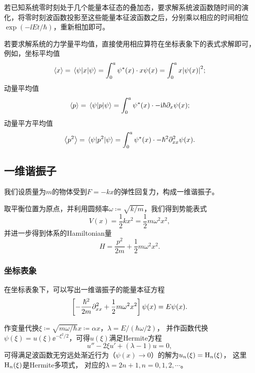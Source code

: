 若已知系统零时刻处于几个能量本征态的叠加态，要求解系统波函数随时间的演化，将零时刻波函数投影至这些能量本征波函数之后，分别乘以相应的时间相位$\exp(-\ii E t/\hbar)$，重新相加即可。

若要求解系统的力学量平均值，直接使用相应算符在坐标表象下的表式求解即可，例如，坐标平均值
\begin{equation}
    \expval{x} = \mel{\psi}{x}{\psi} = \int_0^a \psi^*(x) \cdot x \psi(x) = \int_0^a x \abs{\psi(x)}^2;
\end{equation}
动量平均值
\begin{equation}
    \expval{p} = \mel{\psi}{p}{\psi} = \int_0^a \psi^*(x) \cdot -\ii\hbar\pd_x \psi(x);
\end{equation}
动量平方平均值
\begin{equation}
    \expval{p^2} = \mel{\psi}{p^2}{\psi} = \int_0^a \psi^*(x) \cdot -\hbar^2\pd_{xx}^2 \psi(x).
\end{equation}


\subsection{一维谐振子}
\label{subsec:onedim_osc}

我们设质量为$m$的物体受到$F=-kx$的弹性回复力，构成一维谐振子。

取平衡位置为原点，并利用圆频率$\omega\coloneq\sqrt{k/m}$，我们得到势能表式
\begin{equation}
    V(x) = \frac12 kx^2 = \frac12 m\omega^2 x^2,
\end{equation}
并进一步得到体系的Hamiltonian量
\begin{equation}
    \label{eq:onedim_osc_ham}
    H = \frac{p^2}{2m} + \frac12 m\omega^2 x^2.
\end{equation}

\subsubsection{坐标表象}

在坐标表象下，可以写出一维谐振子的能量本征方程
\begin{equation}
    \left[ -\frac{\hbar^2}{2m}\pd_{xx}^2 + \frac12 m\omega^2 x^2 \right] \psi(x) = E\psi(x).
\end{equation}

作变量代换$\xi\coloneq \sqrt{m\omega/\hbar} x \coloneq \alpha x$，$\lambda = E/(\hbar\omega/2)$，
并作函数代换$\psi(\xi)=u(\xi)\ee^{-\xi^2/2}$，可得$u(\xi)$满足Hermite方程
\begin{equation}
    u''-2\xi u'+(\lambda-1)u = 0,
\end{equation}
可得满足波函数无穷远处渐近行为（$\psi(x)\rightarrow 0$）的解为$u_n(\xi) = \rm{H}_n(\xi)$，
这里$\rm{H}_n(\xi)$是Hermite多项式，
对应的$\lambda=2n+1, n=0,1,2,\cdots$。

